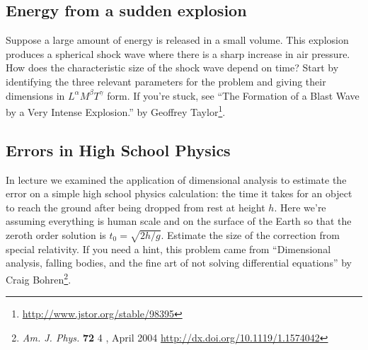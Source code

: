 \documentclass[12pt]{article}
\numberwithin{equation}{section}    %
\begin{document}
%
%

\subsection{Energy from a sudden explosion} 

Suppose a large amount of energy is released in a small volume. This explosion produces a spherical shock wave where there is a sharp increase in air pressure. How does the characteristic size of the shock wave depend on time? Start by identifying the three relevant parameters for the problem and giving their dimensions in $L^\alpha M^\beta T^\gamma$ form. If you're stuck, see ``The Formation of a Blast Wave by a Very Intense Explosion.''  by Geoffrey Taylor\footnote{\url{http://www.jstor.org/stable/98395}}.

\subsection{Errors in High School Physics}

In lecture we examined the application of dimensional analysis to estimate the error on a simple high school physics calculation: the time it takes for an object to reach the ground after being dropped from rest at height $h$. Here we're assuming everything is human scale and on the surface of the Earth so that the zeroth order solution is $t_0 = \sqrt{2h/g}$. Estimate the size of the correction from special relativity. If you need a hint, this problem came from ``Dimensional analysis, falling bodies, and the fine art of not solving differential equations'' by Craig Bohren\footnote{\emph{Am. J. Phys.} \textbf{72}  4 , April 2004 \url{http://dx.doi.org/10.1119/1.1574042}}. 
\end{document}
